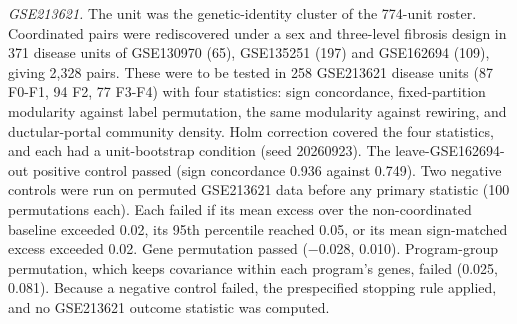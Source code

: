 \emph{GSE213621.} The unit was the genetic-identity cluster of the 774-unit roster. Coordinated pairs were rediscovered under a sex and three-level fibrosis design in 371 disease units of GSE130970 (65), GSE135251 (197) and GSE162694 (109), giving 2,328 pairs. These were to be tested in 258 GSE213621 disease units (87 F0-F1, 94 F2, 77 F3-F4) with four statistics: sign concordance, fixed-partition modularity against label permutation, the same modularity against rewiring, and ductular-portal community density. Holm correction covered the four statistics, and each had a unit-bootstrap condition (seed 20260923). The leave-GSE162694-out positive control passed (sign concordance 0.936 against 0.749). Two negative controls were run on permuted GSE213621 data before any primary statistic (100 permutations each). Each failed if its mean excess over the non-coordinated baseline exceeded 0.02, its 95th percentile reached 0.05, or its mean sign-matched excess exceeded 0.02. Gene permutation passed (−0.028, 0.010). Program-group permutation, which keeps covariance within each program's genes, failed (0.025, 0.081). Because a negative control failed, the prespecified stopping rule applied, and no GSE213621 outcome statistic was computed.

